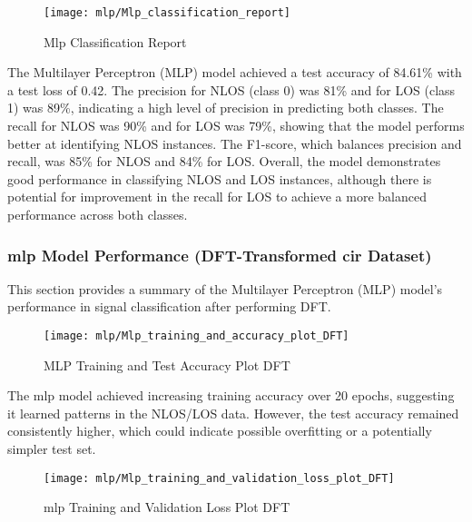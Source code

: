 \begin{figure}[H] 
	\centering
	\texttt{[image: mlp/Mlp\_classification\_report]}
	\caption{Mlp Classification Report}\label{fig:mlp_classification_report}
\end{figure}

The Multilayer Perceptron (MLP) model achieved a test accuracy of 84.61\% with a test loss of 0.42. The precision for NLOS (class 0) was 81\% and for LOS (class 1) was 89\%, indicating a high level of precision in predicting both classes. The recall for NLOS was 90\% and for LOS was 79\%, showing that the model performs better at identifying NLOS instances. The F1-score, which balances precision and recall, was 85\% for NLOS and 84\% for LOS. Overall, the model demonstrates good performance in classifying NLOS and LOS instances, although there is potential for improvement in the recall for LOS to achieve a more balanced performance across both classes.

\subsubsection{\acrshort{mlp} Model Performance (DFT-Transformed \acrshort{cir} Dataset)}

This section provides a summary of the Multilayer Perceptron (MLP) model's performance in signal classification after performing DFT.

\begin{figure}[H] 
	\centering
	\texttt{[image: mlp/Mlp\_training\_and\_accuracy\_plot\_DFT]}
	\caption{MLP Training and Test Accuracy Plot DFT}\label{fig:Mlp_training_and_accuracy_plot_DFT}
\end{figure}

The \acrshort{mlp} model achieved increasing training accuracy over 20 epochs, suggesting it learned patterns in the NLOS/LOS data. However, the test accuracy remained consistently higher, which could indicate possible overfitting or a potentially simpler test set.

\begin{figure}[H] 
	\centering
	\texttt{[image: mlp/Mlp\_training\_and\_validation\_loss\_plot\_DFT]}
	\caption{\acrshort{mlp} Training and Validation Loss Plot DFT}\label{fig:Mlp_training_and_validation_loss_plot_DFT}
\end{figure}

